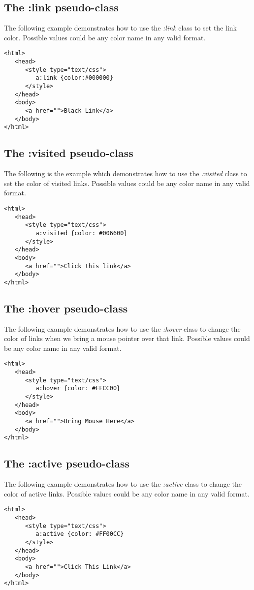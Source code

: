\documentclass[a4paper,oneside]{book}
\numberwithin{equation}{chapter}
\begin{document}
\subsection{The :link pseudo-class}
The following example demonstrates how to use the \textit{:link} class to set the link color. Possible values could be any color name in any valid format.
\begin{verbatim}
<html>
   <head>
      <style type="text/css">
         a:link {color:#000000}
      </style>
   </head>
   <body>
      <a href="">Black Link</a>
   </body>
</html>
\end{verbatim}
\subsection{The :visited pseudo-class}
The following is the example which demonstrates how to use the \textit{:visited} class to set the color of visited links. Possible values could be any color name in any valid format.
\begin{verbatim}
<html>
   <head>
      <style type="text/css">
         a:visited {color: #006600}
      </style>
   </head>
   <body>
      <a href="">Click this link</a>
   </body>
</html> 
\end{verbatim}
\subsection{The :hover pseudo-class}
The following example demonstrates how to use the \textit{:hover} class to change the color of links when we bring a mouse pointer over that link. Possible values could be any color name in any valid format.
\begin{verbatim}
<html>
   <head>
      <style type="text/css">
         a:hover {color: #FFCC00}
      </style>
   </head>
   <body>
      <a href="">Bring Mouse Here</a>
   </body>
</html> 
\end{verbatim}
\subsection{The :active pseudo-class}
The following example demonstrates how to use the \textit{:active} class to change the color of active links. Possible values could be any color name in any valid format.
\begin{verbatim}
<html>
   <head>
      <style type="text/css">
         a:active {color: #FF00CC}
      </style>
   </head>
   <body>
      <a href="">Click This Link</a>
   </body>
</html> 
\end{verbatim}
\end{document}
